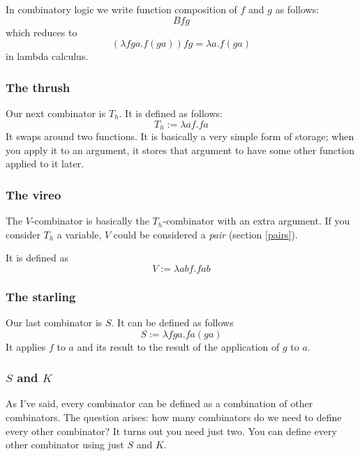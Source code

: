 \documentclass[11pt]{article}
\begin{document}
In combinatory logic we write function composition of \(f\) and \(g\) as
follows:
\[Bfg\]
which reduces to
\[(\lambda fga.f(ga))fg=\lambda a.f(ga)\]
in lambda calculus.

\subsubsection{The thrush}\label{thrush}

Our next combinator is \(T_{h}\). It is defined as follows:
\[T_{h}:=\lambda af.fa\]
It swaps around two functions. It is basically a very simple form of storage;
when you apply it to an argument, it stores that argument to have some other
function applied to it later.


\subsubsection{The vireo}\label{vireo}

The \(V\)-combinator is basically the \(T_h\)-combinator with an extra
argument. If you consider \(T_h\) a variable, \(V\) could be considered a
\emph{pair} (section \ref{pairs}).

It is defined as
\[V:=\lambda abf.fab\]

\subsubsection{The starling}

Our last combinator is \(S\). It can be defined as follows
\[S:=\lambda fga.fa(ga)\]
It applies \(f\) to \(a\) and its result to the result of the application of
\(g\) to \(a\).

\subsubsection{\(S\) and \(K\)}


As I've said, every combinator can be defined as a combination of other
combinators. The question arises: how many combinators do we need to define
every other combinator? It turns out you need just two. You can define every
other combinator using just \(S\) and \(K\).
\end{document}
